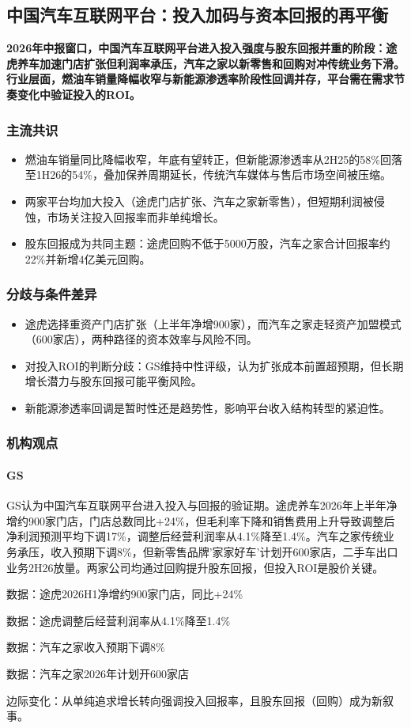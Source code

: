 \documentclass[11pt]{ctexart}
\begin{document}
\subsection{中国汽车互联网平台：投入加码与资本回报的再平衡}
\textbf{2026年中报窗口，中国汽车互联网平台进入投入强度与股东回报并重的阶段：途虎养车加速门店扩张但利润率承压，汽车之家以新零售和回购对冲传统业务下滑。行业层面，燃油车销量降幅收窄与新能源渗透率阶段性回调并存，平台需在需求节奏变化中验证投入的ROI。}
\subsubsection*{主流共识}
\begin{itemize}
  \item 燃油车销量同比降幅收窄，年底有望转正，但新能源渗透率从2H25的58\%回落至1H26的54\%，叠加保养周期延长，传统汽车媒体与售后市场空间被压缩。
  \item 两家平台均加大投入（途虎门店扩张、汽车之家新零售），但短期利润被侵蚀，市场关注投入回报率而非单纯增长。
  \item 股东回报成为共同主题：途虎回购不低于5000万股，汽车之家合计回报率约22\%并新增4亿美元回购。
\end{itemize}
\subsubsection*{分歧与条件差异}
\begin{itemize}
  \item 途虎选择重资产门店扩张（上半年净增900家），而汽车之家走轻资产加盟模式（600家店），两种路径的资本效率与风险不同。
  \item 对投入ROI的判断分歧：GS维持中性评级，认为扩张成本前置超预期，但长期增长潜力与股东回报可能平衡风险。
  \item 新能源渗透率回调是暂时性还是趋势性，影响平台收入结构转型的紧迫性。
\end{itemize}
\subsubsection*{机构观点}
\paragraph{GS} GS认为中国汽车互联网平台进入投入与回报的验证期。途虎养车2026年上半年净增约900家门店，门店总数同比+24\%，但毛利率下降和销售费用上升导致调整后净利润预测平均下调17\%，调整后经营利润率从4.1\%降至1.4\%。汽车之家传统业务承压，收入预期下调8\%，但新零售品牌'家家好车'计划开600家店，二手车出口业务2H26放量。两家公司均通过回购提升股东回报，但投入ROI是股价关键。
{\small\color{refgray}数据：途虎2026H1净增约900家门店，同比+24\%\par}
{\small\color{refgray}数据：途虎调整后经营利润率从4.1\%降至1.4\%\par}
{\small\color{refgray}数据：汽车之家收入预期下调8\%\par}
{\small\color{refgray}数据：汽车之家2026年计划开600家店\par}
{\small\color{refgray}边际变化：从单纯追求增长转向强调投入回报率，且股东回报（回购）成为新叙事。\par}
\end{document}
